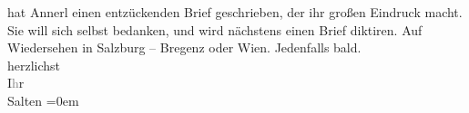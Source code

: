 \begin{ledgroupsized}[t]{13cm}
               hat Annerl einen entzückenden Brief
               geschrieben, der ihr großen Eindruck macht. Sie will sich selbst {\pb}bedanken, und wird nächstens
               einen Brief diktiren.\pend
           \pstart
           Auf Wiedersehen in Salzburg – Bregenz oder Wien. Jedenfalls bald. {\\[\baselineskip]}herzlichst {\\[\baselineskip]}I\textcolor{gray}{h}r {\\[\baselineskip]}\spacefill\mbox{Salten}\pend
           \leftskip=0em{}
         
         \endnumbering{}\end{ledgroupsized}  \newcommand{\dateiname}{L03506}\newcommand{\titel}{Felix Salten an Arthur Schnitzler, 23. 8. 1909}\newcommand{\editorInnen}{Martin Anton Müller und Laura Untner}
      